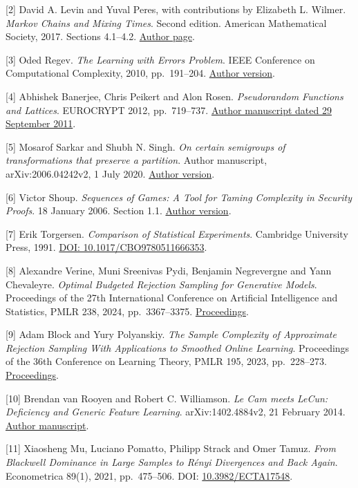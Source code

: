 \documentclass[
]{article}
\begin{document}
{[}2{]} David A. Levin and Yuval Peres, with contributions by Elizabeth
L. Wilmer. \emph{Markov Chains and Mixing Times}. Second edition.
American Mathematical Society, 2017. Sections 4.1--4.2.
\href{https://pages.uoregon.edu/dlevin/MARKOV/}{Author page}.

{[}3{]} Oded Regev. \emph{The Learning with Errors Problem}. IEEE
Conference on Computational Complexity, 2010, pp.~191--204.
\href{https://cims.nyu.edu/~regev/papers/lwesurvey.pdf}{Author version}.

{[}4{]} Abhishek Banerjee, Chris Peikert and Alon Rosen.
\emph{Pseudorandom Functions and Lattices}. EUROCRYPT 2012,
pp.~719--737.
\href{https://web.eecs.umich.edu/~cpeikert/pubs/prf-lattice.pdf}{Author
manuscript dated 29 September 2011}.

{[}5{]} Mosarof Sarkar and Shubh N. Singh. \emph{On certain semigroups
of transformations that preserve a partition}. Author manuscript,
arXiv:2006.04242v2, 1 July 2020.
\href{https://arxiv.org/pdf/2006.04242}{Author version}.

{[}6{]} Victor Shoup. \emph{Sequences of Games: A Tool for Taming
Complexity in Security Proofs}. 18 January 2006. Section 1.1.
\href{https://www.shoup.net/papers/games.pdf}{Author version}.

{[}7{]} Erik Torgersen. \emph{Comparison of Statistical Experiments}.
Cambridge University Press, 1991.
\href{https://doi.org/10.1017/CBO9780511666353}{DOI:
10.1017/CBO9780511666353}.

{[}8{]} Alexandre Verine, Muni Sreenivas Pydi, Benjamin Negrevergne and
Yann Chevaleyre. \emph{Optimal Budgeted Rejection Sampling for
Generative Models}. Proceedings of the 27th International Conference on
Artificial Intelligence and Statistics, PMLR 238, 2024, pp.~3367--3375.
\href{https://proceedings.mlr.press/v238/verine24a.html}{Proceedings}.

{[}9{]} Adam Block and Yury Polyanskiy. \emph{The Sample Complexity of
Approximate Rejection Sampling With Applications to Smoothed Online
Learning}. Proceedings of the 36th Conference on Learning Theory, PMLR
195, 2023, pp.~228--273.
\href{https://proceedings.mlr.press/v195/block23a.html}{Proceedings}.

{[}10{]} Brendan van Rooyen and Robert C. Williamson. \emph{Le Cam meets
LeCun: Deficiency and Generic Feature Learning}. arXiv:1402.4884v2, 21
February 2014. \href{https://arxiv.org/abs/1402.4884v2}{Author
manuscript}.

{[}11{]} Xiaosheng Mu, Luciano Pomatto, Philipp Strack and Omer Tamuz.
\emph{From Blackwell Dominance in Large Samples to Rényi Divergences and
Back Again}. Econometrica 89(1), 2021, pp.~475--506. DOI:
\href{https://doi.org/10.3982/ECTA17548}{10.3982/ECTA17548}.
\end{document}
